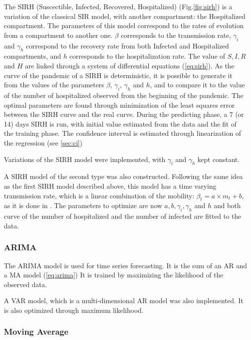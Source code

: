 The SIRH (Suscectible, Infected, Recovered, Hospitalized) (Fig.\ref{fig:sirh}) is a variation of the classical SIR model, with another compartment: the Hospitalized compartment. 
The parameters of this model correspond to the rates of evolution from a compartment to another one. 
$\beta$ corresponds to the transmission rate, $\gamma_i$ and $\gamma_h$ correspond to the recovery rate from both Infected and Hospitalized compartments, and $h$ corresponds to the hospitalization rate. 
The value of $S, I, R$ and $H$ are linked through a system of differential equations (\ref{eq:sirh}). 
As the curve of the pandemic of a SIRH is deterministic, it is possible to generate it from the values of the parameters $\beta$, $\gamma_i$, $\gamma_h$ and $h$, and to compare it to the value of the number of hospitalized observed from the beginning of the pandemic.
The optimal parameters are found through minimization of the least squares error between the SIRH curve and the real curve. 
During the predicting phase, a 7 (or 14) days SIRH is run, with initial value estimated from the data and the fit of the training phase.
The confidence interval is estimated through linearization of the regression (see \ref{sec:ci})

Variations of the SIRH model were implemented, with $\gamma_i$ and $\gamma_h$ kept constant. 

A SIRH model of the second type was also constructed. 
Following the same idea as the first SIRH model described above, this model has a time varying transmission rate, which is a linear combination of the mobility: $\beta_t = a \times m_t + b$, as it is done in \cite{gerlee2021predicting}. 
The parameters to optimize are now $a, b, \gamma_i, \gamma_h$ and $h$ and both curve of the number of hospitalized and the number of infected are fitted to the data. 


\subsubsection{ARIMA}

The ARIMA model is used for time series forecasting. 
It is the sum of an AR and a MA model (\ref{eq:arima})
It is trained by maximizing the likelihood of the observed data. 

A VAR model, which is a multi-dimensional AR model was also implemented. 
It is also optimized through maximum likelihood. 

\subsubsection{Moving Average}

